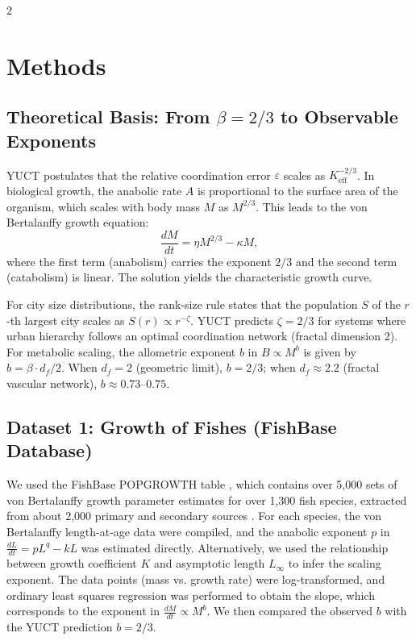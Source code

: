 \documentclass[11pt,a4paper]{article}
\newcommand{\eps}{\varepsilon}
\newcommand{\Keff}{K_{\mathrm{eff}}}
\newcommand{\betaf}{\beta}
\newcommand{\df}{d_f}
\begin{document}
\begin{multicols}{2}
		\section{Methods}
		
		\subsection{Theoretical Basis: From \(\beta = 2/3\) to Observable Exponents}
		
		YUCT postulates that the relative coordination error \(\eps\) scales as \(\Keff^{-2/3}\). In biological growth, the anabolic rate \(A\) is proportional to the surface area of the organism, which scales with body mass \(M\) as \(M^{2/3}\). This leads to the von Bertalanffy growth equation:
		\[
		\frac{dM}{dt} = \eta M^{2/3} - \kappa M,
		\]
		where the first term (anabolism) carries the exponent \(2/3\) and the second term (catabolism) is linear. The solution yields the characteristic growth curve.
		
		For city size distributions, the rank-size rule states that the population \(S\) of the \(r\)-th largest city scales as \(S(r) \propto r^{-\zeta}\). YUCT predicts \(\zeta = 2/3\) for systems where urban hierarchy follows an optimal coordination network (fractal dimension 2). For metabolic scaling, the allometric exponent \(b\) in \(B \propto M^{b}\) is given by \(b = \betaf \cdot \df / 2\). When \(\df = 2\) (geometric limit), \(b = 2/3\); when \(\df \approx 2.2\) (fractal vascular network), \(b \approx 0.73\)–\(0.75\).
		
		\subsection{Dataset 1: Growth of Fishes (FishBase Database)}
		
		We used the FishBase POPGROWTH table \cite{FishBase}, which contains over 5,000 sets of von Bertalanffy growth parameter estimates for over 1,300 fish species, extracted from about 2,000 primary and secondary sources \cite{Pauly1998}. For each species, the von Bertalanffy length-at-age data were compiled, and the anabolic exponent \(p\) in \(\frac{dL}{dt} = p L^{q} - k L\) was estimated directly. Alternatively, we used the relationship between growth coefficient \(K\) and asymptotic length \(L_\infty\) to infer the scaling exponent. The data points (mass vs. growth rate) were log-transformed, and ordinary least squares regression was performed to obtain the slope, which corresponds to the exponent in \(\frac{dM}{dt} \propto M^{b}\). We then compared the observed \(b\) with the YUCT prediction \(b = 2/3\).
		

\end{multicols}
\end{document}
